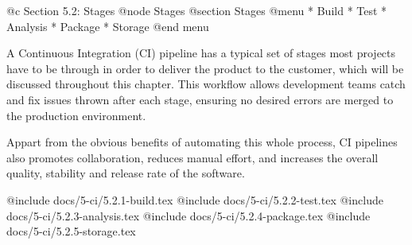 @c Section 5.2: Stages
@node Stages
@section Stages
@menu
* Build
* Test
* Analysis
* Package
* Storage
@end menu

A Continuous Integration (CI) pipeline has a typical set of stages most projects have to be through in order to deliver the product to the customer, which will be discussed throughout this chapter. This workflow allows development teams catch and fix issues thrown after each stage, ensuring no desired errors are merged to the production environment.

Appart from the obvious benefits of automating this whole process, CI pipelines also promotes collaboration, reduces manual effort, and increases the overall quality, stability and release rate of the software.

@include docs/5-ci/5.2.1-build.tex
@include docs/5-ci/5.2.2-test.tex
@include docs/5-ci/5.2.3-analysis.tex
@include docs/5-ci/5.2.4-package.tex
@include docs/5-ci/5.2.5-storage.tex
